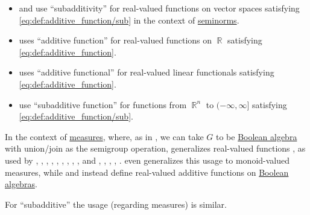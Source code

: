 \begin{remark}
\begin{itemize}
    \item {} and  use \enquote{subadditivity} for real-valued functions on vector spaces satisfying \eqref{eq:def:additive_function/sub} in the context of \hyperref[def:seminorm]{seminorms}.

    \item {} uses \enquote{additive function} for real-valued functions on \( \BbbR \) satisfying \eqref{eq:def:additive_function}.

    \item {} uses \enquote{additive functional} for real-valued linear functionals satisfying \eqref{eq:def:additive_function}.

    \item {} use \enquote{subadditive function} for functions from \( \BbbR^n \) to \( (-\infty, \infty] \) satisfying \eqref{eq:def:additive_function/sub}.
  \end{itemize}

  In the context of \hyperref[def:measure]{measures}, where, as in , we can take \( G \) to be \hyperref[def:boolean_algebra]{Boolean algebra} with union/join as the semigroup operation,  generalizes  real-valued functions , as used by
  ,
  ,
  ,
  ,
  ,
  ,
  ,
  ,
  ,
   and
  ,
  ,
  ,
  ,
  .
   even generalizes this usage to monoid-valued measures, while  and  instead define real-valued additive functions on \hyperref[def:boolean_algebra]{Boolean algebras}.

  For \enquote{subadditive} the usage (regarding measures) is similar.
\end{remark}

